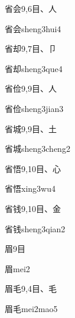 \begin{entry}{省会}{9,6}{⽬、⼈}
  \begin{phonetics}{省会}{sheng3hui4}
  \end{phonetics}
\end{entry}

\begin{entry}{省却}{9,7}{⽬、⼙}
  \begin{phonetics}{省却}{sheng3que4}
  \end{phonetics}
\end{entry}

\begin{entry}{省俭}{9,9}{⽬、⼈}
  \begin{phonetics}{省俭}{sheng3jian3}
  \end{phonetics}
\end{entry}

\begin{entry}{省城}{9,9}{⽬、⼟}
  \begin{phonetics}{省城}{sheng3cheng2}
  \end{phonetics}
\end{entry}

\begin{entry}{省悟}{9,10}{⽬、⼼}
  \begin{phonetics}{省悟}{xing3wu4}
  \end{phonetics}
\end{entry}

\begin{entry}{省钱}{9,10}{⽬、⾦}
  \begin{phonetics}{省钱}{sheng3qian2}
  \end{phonetics}
\end{entry}

\begin{entry}{眉}{9}{⽬}
  \begin{phonetics}{眉}{mei2}
  \end{phonetics}
\end{entry}

\begin{entry}{眉毛}{9,4}{⽬、⽑}
  \begin{phonetics}{眉毛}{mei2mao5}
  \end{phonetics}
\end{entry}

